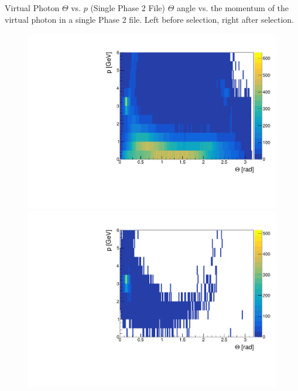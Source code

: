\documentclass[10pt]{beamer}
\begin{document}
\begin{frame}{Virtual Photon $\Theta$ vs. $p$ (Single Phase 2 File)}
	$\Theta$ angle vs. the momentum of the virtual photon in a single Phase 2 file. Left before selection, right after selection.
	
	\begin{figure}
		\centering
		\begin{minipage}{.5\textwidth}
			\centering
			\includegraphics[width=\textwidth]{gg/data/ThetaMgg_BS}
			
		\end{minipage}%
		\begin{minipage}{.5\textwidth}
			\centering
			\includegraphics[width=\textwidth]{gg/data/ThetaMgg_AS}
			
		\end{minipage}
	\end{figure}
\end{frame}
\end{document}
